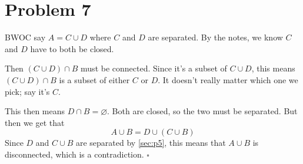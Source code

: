 \documentclass[12pt]{article}
\begin{document}
\section{Problem 7}

BWOC say $A=C \cup D$ where $C$ and $D$ are separated.
By the notes, we know $C$ and $D$ have to both be closed.

Then $(C \cup D) \cap B$ must be connected.
Since it's a subset of $C \cup D$, this means $(C \cup D) \cap B$ is a subset of either $C$ or $D$.
It doesn't really matter which one we pick; say it's $C$.

This then means $D \cap B =\varnothing$.
Both are closed, so the two must be separated.
But then we get that
\[A \cup B = D \cup (C \cup B)\]
Since $D$ and $C \cup B$ are separated by \ref{sec:p5}, this means that $A \cup B$
is disconnected, which is a contradiction. $\square$
\end{document}
